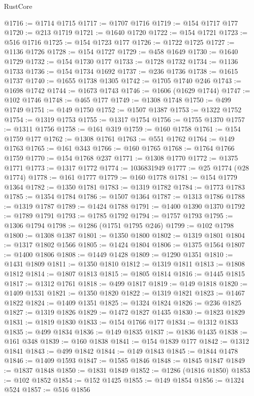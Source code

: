 \begin{lexlean}{RustCore}
\begin{coremodule}
@1716 := @1714 @1715
@1717 := @1707 @1716
@1719 := @154 @1717 @177
@1720 := @213 @1719
@1721 := @1640 @1720
@1722 := @154 @1721
@1723 := @516 @1716
@1725 := @154 @1723 @177
@1726 := @1722 @1725
@1727 := @1136 @1726
@1728 := @154 @1727
@1729 := @458 @1649
@1730 := @1640 @1729
@1732 := @154 @1730 @177
@1733 := @1728 @1732
@1734 := @1136 @1733
@1736 := @154 @1734 @1692
@1737 := @236 @1736
@1738 := @1615 @1737
@1740 := @1655 @1738 @1305
@1742 := @1705 @1740 @246
@1743 := @1698 @1742
@1744 := @1673 @1743
@1746 := @1606 (@1629 @1744)
@1747 := @102 @1746
@1748 := @465 @177
@1749 := @1308 @1748
@1750 := @499 @1749
@1751 := @149 @1750
@1752 := @1507 @1387
@1753 := @1322 @1752
@1754 := @1319 @1753
@1755 := @1317 @1754
@1756 := @1755 @1370
@1757 := @1311 @1756
@1758 := @161 @319
@1759 := @160 @1758
@1761 := @154 @1759 @177
@1762 := @1308 @1761
@1763 := @551 @1762
@1764 := @149 @1763
@1765 := @161 @343
@1766 := @160 @1765
@1768 := @1764 @1766 @1759
@1770 := @154 @1768 @237
@1771 := @1308 @1770
@1772 := @1375 @1771
@1773 := @1317 @1772
@1774 := 1036831949
@1777 := @25 @1774 (@28 @1774)
@1778 := @161 @1777
@1779 := @160 @1778
@1781 := @154 @1779 @1364
@1782 := @1350 @1781
@1783 := @1319 @1782
@1784 := @1773 @1783
@1785 := @1354 @1784
@1786 := @1507 @1364
@1787 := @1313 @1786
@1788 := @1319 @1787
@1789 := @1424 @1788
@1791 := @1400 @1390 @1370
@1792 := @1789 @1791
@1793 := @1785 @1792
@1794 := @1757 @1793
@1795 := @1306 @1794
@1798 := @1286 (@1751 @1795 @246)
@1799 := @102 @1798
@1800 := @1308 @1387
@1801 := @1350 @1800
@1802 := @1319 @1801
@1804 := @1317 @1802 @1566
@1805 := @1424 @1804
@1806 := @1375 @1564
@1807 := @1400 @1806
@1808 := @1449 @1428
@1809 := @1290 @1351
@1810 := @1431 @1809
@1811 := @1350 @1810
@1812 := @1319 @1811
@1813 := @1808 @1812
@1814 := @1807 @1813
@1815 := @1805 @1814
@1816 := @1445 @1815
@1817 := @1312 @1761
@1818 := @499 @1817
@1819 := @149 @1818
@1820 := @1409 @1531
@1821 := @1350 @1820
@1822 := @1319 @1821
@1823 := @1467 @1822
@1824 := @1409 @1351
@1825 := @1324 @1824
@1826 := @236 @1825
@1827 := @1319 @1826
@1829 := @1472 @1827 @1435
@1830 := @1823 @1829
@1831 := @1819 @1830
@1833 := @154 @1766 @177
@1834 := @1312 @1833
@1835 := @499 @1834
@1836 := @149 @1835
@1837 := @1836 @1435
@1838 := @161 @348
@1839 := @160 @1838
@1841 := @154 @1839 @177
@1842 := @1312 @1841
@1843 := @499 @1842
@1844 := @149 @1843
@1845 := @1844 @1478
@1846 := @1409 @1593
@1847 := @1585 @1846
@1848 := @1845 @1847
@1849 := @1837 @1848
@1850 := @1831 @1849
@1852 := @1286 (@1816 @1850)
@1853 := @102 @1852
@1854 := @152 @1425
@1855 := @149 @1854
@1856 := @1324 @524
@1857 := @516 @1856

\end{coremodule}
\end{lexlean}
